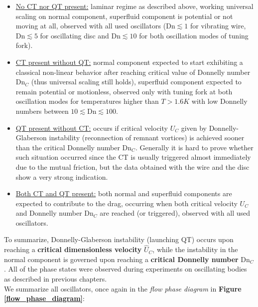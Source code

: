 \begin{itemize}
	\item \underline{No CT nor QT present:} laminar regime as described above, working universal scaling on normal component, superfluid component is potential or not moving at all, observed with all used oscillators ($\text{Dn} \lesssim 1$ for vibrating wire, $\text{Dn} \lesssim 5$ for oscillating disc and $\text{Dn} \lesssim 10$ for both oscillation modes of tuning fork).

	\item \underline{CT present without QT:} normal component expected to start exhibiting a classical non-linear behavior after reaching critical value of Donnelly number $\text{Dn}_C$ (thus universal scaling still holds), superfluid component expected to remain potential or motionless, observed only with tuning fork at both oscillation modes for temperatures higher than $T > 1.6\unit{K}$ with low Donnelly numbers between $10 \lesssim \text{Dn} \lesssim 100$.

	\item \underline{QT present without CT:} occurs if critical velocity $U_C$ given by Donnelly-Glaberson instability (reconnection of remnant vortices) is achieved sooner than the critical Donnelly number $\text{Dn}_C$. Generally it is hard to prove whether such situation occurred since the CT is usually triggered almost immediately due to the mutual friction, but the data obtained with the wire and the disc show a very strong indication.

	\item \underline{Both CT and QT present:} both normal and superfluid components are expected to contribute to the drag, occurring when both critical velocity $U_C$ and Donnelly number $\text{Dn}_C$ are reached (or triggered), observed with all used oscillators.
\end{itemize}

To summarize, Donnelly-Glaberson instability (launching QT) occurs upon reaching a \textbf{critical dimensionless velocity} $\hat{U}_C$, while the instability in the normal component is governed  upon reaching a \textbf{critical Donnelly number} $\text{Dn}_C$. All of the phase states were observed during experiments on oscillating bodies as described in previous chapters.\\
We summarize all oscillators, once again in the \textit{flow phase diagram} in \textbf{Figure \ref{flow_phase_diagram}}:


